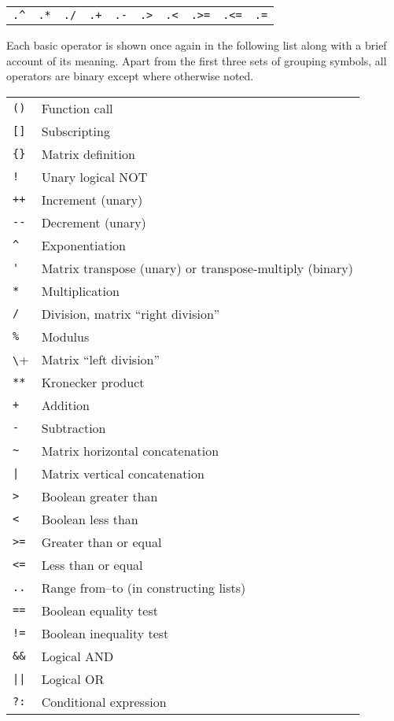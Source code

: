 \begin{center}
\begin{tabular}{cccccccccc}
\verb|.^| & \texttt{.*} & \texttt{./} & \texttt{.+} &
 \texttt{.-} & \verb|.>| & \verb|.<| & \verb|.>=| &
 \verb|.<=| & \texttt{.=} \\
\end{tabular}
\end{center}

Each basic operator is shown once again in the following list along
with a brief account of its meaning. Apart from the first three sets
of grouping symbols, all operators are binary except where otherwise
noted.

\begin{longtable}{ll}
\verb|()| & Function call \\
\verb|[]|  & Subscripting \\
\verb|{}|  & Matrix definition \\
\texttt{!} & Unary logical NOT \\
\texttt{++} & Increment (unary) \\
\verb|--| & Decrement (unary) \\
\verb|^|  & Exponentiation \\
\verb|'|  & Matrix transpose (unary) or transpose-multiply (binary) \\
\texttt{*} & Multiplication \\
\texttt{/} & Division, matrix ``right division'' \\
\texttt{\%} & Modulus \\
\verb+\+    & Matrix ``left division'' \\
\texttt{**} & Kronecker product \\
\texttt{+} & Addition \\
\texttt{-} & Subtraction \\
\verb|~| & Matrix horizontal concatenation \\
\verb+|+ & Matrix vertical concatenation \\
\verb|>| & Boolean greater than \\
\verb|<| & Boolean less than \\
\verb|>=| & Greater than or equal \\
\verb|<=| & Less than or equal \\
\texttt{..} & Range from--to (in constructing lists) \\
\texttt{==} & Boolean equality test \\
\texttt{!=} & Boolean inequality test \\
\verb|&&| & Logical AND \\
\verb+||+ & Logical OR \\
\texttt{?:} & Conditional expression \\
\end{longtable}

